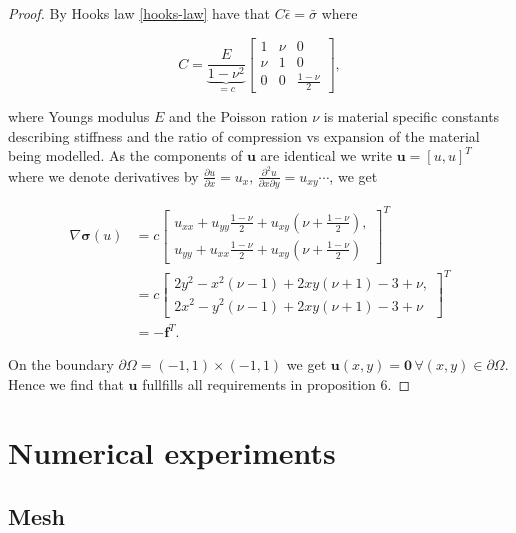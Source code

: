 \documentclass[5pt,a4paper,english]{elsarticle}%
\begin{document}
\begin{proof}
By Hooks law \eqref{hooks-law} have that $C \bar{\epsilon} = \bar{\sigma}$ where 

\begin{equation*}
    C = \underbrace{\frac{E}{1-\nu^2}}_{=c}\begin{bmatrix}
        1&\nu&0\\
        \nu&1&0\\
        0&0&\frac{1-\nu}{2}
    \end{bmatrix},
\end{equation*}

\noindent where Youngs modulus $E$ and the Poisson ration $\nu$ is material specific constants describing stiffness and the ratio of compression vs expansion of the material being modelled. As the components of $\bm u$ are identical we write $\bm u = [u,u]^T$ where we denote derivatives by $\frac{\partial u}{\partial x} = u_x, \, \frac{\partial^2 u}{\partial x \partial y} = u_{xy} \cdots$,
we get

\begin{align}
    \nabla\bm\sigma(u) &= 
    c\begin{bmatrix}
        u_{xx} + u_{yy}\frac{1-\nu}{2} + u_{xy}(\nu + \frac{1-\nu}{2}),\\
        u_{yy} + u_{xx}\frac{1-\nu}{2} + u_{xy}(\nu + \frac{1-\nu}{2})
    \end{bmatrix}^T\\
    &= c\begin{bmatrix}
        2y^2 - x^2(\nu - 1) +2xy(\nu +1) - 3 + \nu, \\
        2x^2 - y^2(\nu - 1) +2xy(\nu +1) - 3 + \nu
    \end{bmatrix}^T\\
    &= -\bm f^T.
\end{align}

On the boundary $\partial \Omega = (-1,1)\times(-1,1)$ we get $\bm u(x,y) = \bm 0 \, \forall (x,y) \in \partial \Omega$.
Hence we find that $\bm u$ fullfills all requirements in proposition 6.  
\end{proof}
    


\section{Numerical experiments}
\subsection{Mesh}
\end{document}
